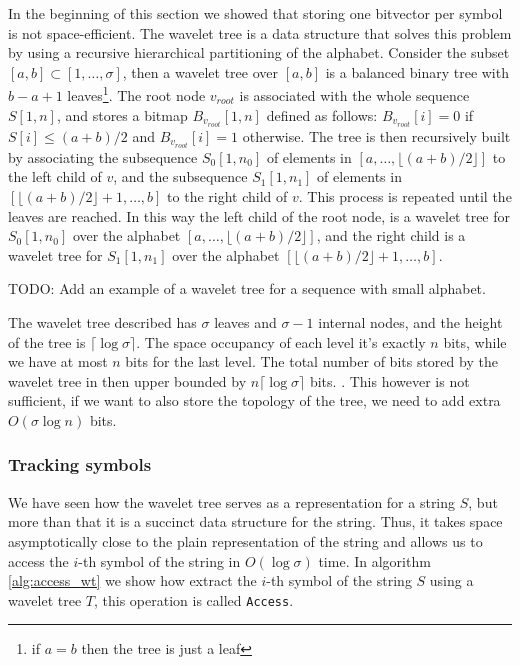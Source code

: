 In the beginning of this section we showed that storing one bitvector per symbol is not space-efficient. The wavelet tree is a data structure that solves this problem by using a recursive hierarchical partitioning of the alphabet. Consider the subset $[a,b] \subset [1, \dots, \sigma]$, then a wavelet tree over $[a,b]$ is a balanced binary tree with $b-a+1$ leaves\footnote{if $a=b$ then the tree is just a leaf}. The root node $v_{root}$ is associated with the whole sequence $S[1,n]$, and stores a bitmap $B_{v_{root}}[1,n]$ defined as follows: $B_{v_{root}}[i] = 0$ if $S[i] \leq (a+b)/2$ and $B_{v_{root}}[i] = 1$ otherwise. The tree is then recursively built by associating the subsequence $S_0[1,n_0]$ of elements in $[a, \dots,\lfloor (a+b)/2 \rfloor ]$ to the left child of $v$, and the subsequence $S_1[1,n_1]$ of elements in $[\lfloor (a+b)/2 \rfloor +1,\dots, b]$ to the right child of $v$. This process is repeated until the leaves are reached. In this way the left child of the root node, is a wavelet tree for $S_0[1,n_0]$ over the alphabet $[a,\dots, \lfloor (a+b)/2 \rfloor ]$, and the right child is a wavelet tree for $S_1[1,n_1]$ over the alphabet $[\lfloor (a+b)/2 \rfloor +1,\dots, b]$. \cite{WTForALL}

\begin{example}
    TODO: Add an example of a wavelet tree for a sequence with small alphabet.
\end{example}

\begin{remark} \label{rem:space_occupancy_wavelet_tree}
    The wavelet tree described has $\sigma$ leaves and $\sigma-1$ internal nodes, and the height of the tree is $ \lceil \log \sigma \rceil$. The space occupancy of each level it's exactly $n$ bits, while we have at most $n$ bits for the last level. The total number of bits stored by the wavelet tree in then upper bounded by $n \lceil \log \sigma \rceil$ bits. \cite{WTForALL}. This however is not sufficient, if we want to also store the topology of the tree, we need to add extra $O(\sigma \log n)$ bits.
\end{remark}

\subsubsection*{Tracking symbols}
We have seen how the wavelet tree serves as a representation for a string $S$, but more than that it is a succinct data structure for the string. Thus, it takes space asymptotically close to the plain representation of the string and allows us to access the $i$-th symbol of the string in $O(\log \sigma)$ time. In algorithm \ref{alg:access_wt} we show how extract the $i$-th symbol of the string $S$ using a wavelet tree $T$, this operation is called \texttt{Access}. \vspace{0.4cm}


